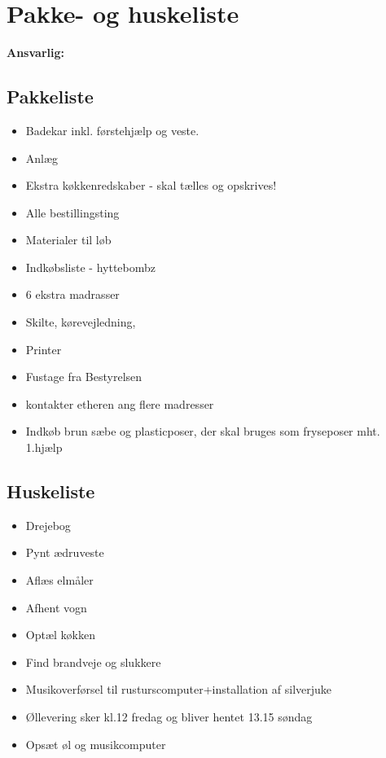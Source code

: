 \section{Pakke- og huskeliste}
\textbf{Ansvarlig: \KABS}

\subsection{Pakkeliste}
\begin{multicols}{2}
\begin{itemize}
\item Badekar inkl. førstehjælp og veste.
\item Anlæg
\item Ekstra køkkenredskaber - skal tælles og opskrives!
\item Alle bestillingsting
\item Materialer til løb
\item Indkøbsliste - hyttebombz
\item 6 ekstra madrasser
\item Skilte, kørevejledning,   
\item Printer
\item Fustage fra Bestyrelsen
\item \KABS kontakter etheren ang flere madresser
\item Indkøb brun sæbe og plasticposer, der skal bruges som fryseposer mht. 1.hjælp
\end{itemize}
\end{multicols}


\subsection{Huskeliste}
\begin{multicols}{2}
\begin{itemize}
\item Drejebog
\item Pynt ædruveste
\item Aflæs elmåler
\item Afhent vogn
\item Optæl køkken
\item Find brandveje og slukkere
\item Musikoverførsel til rusturscomputer+installation af silverjuke 
\item Øllevering sker kl.12 fredag og bliver hentet 13.15 søndag
\item Opsæt øl og musikcomputer
\end{itemize}
\end{multicols}